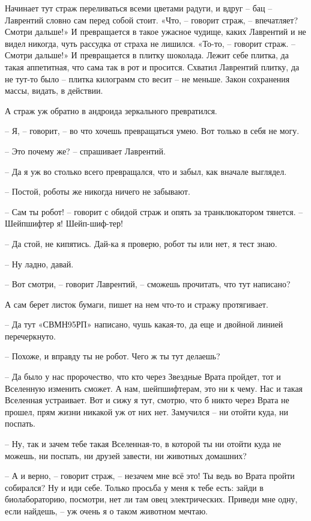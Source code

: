 \documentclass[ebook,oneside,final,openright]{memoir}
\begin{document}
Начинает тут страж переливаться всеми цветами радуги, и вдруг – бац – Лаврентий словно сам перед собой стоит. «Что, – говорит страж, – впечатляет? Смотри дальше!» И превращается в такое ужасное чудище, каких Лаврентий и не видел никогда, чуть рассудка от страха не лишился. «То-то, – говорит страж. – Смотри дальше!» И превращается в плитку шоколада. Лежит себе плитка, да такая аппетитная, что сама так в рот и просится. Схватил Лаврентий плитку, да не тут-то было – плитка килограмм сто весит – не меньше. Закон сохранения массы, видать, в действии. \par
\par
А страж уж обратно в андроида зеркального превратился. \par
– Я, – говорит, – во что хочешь превращаться умею. Вот только в себя не могу. \par
– Это почему же? – спрашивает Лаврентий.\par
– Да я уж во столько всего превращался, что и забыл, как вначале выглядел. \par
– Постой, роботы же никогда ничего не забывают. \par
– Сам ты робот! – говорит с обидой страж и опять за транклюкатором тянется. – Шейпшифтер я! Шейп-шиф-тер! \par
– Да стой, не кипятись. Дай-ка я проверю, робот ты или нет, я тест знаю. \par
– Ну ладно, давай. \par
– Вот смотри, – говорит Лаврентий, – сможешь прочитать, что тут написано? \par
А сам берет листок бумаги, пишет на нем что-то и стражу протягивает. \par
– Да тут «СВМН95РП» написано, чушь какая-то, да еще и двойной линией перечеркнуто.\par
– Похоже, и вправду ты не робот. Чего ж ты тут делаешь? \par
– Да было у нас пророчество, что кто через Звездные Врата пройдет, тот и Вселенную изменить сможет. А нам, шейпшифтерам, это ни к чему. Нас и такая Вселенная устраивает. Вот и сижу я тут, смотрю, что б никто через Врата не прошел, прям жизни никакой уж от них нет. Замучился – ни отойти куда, ни поспать. \par
– Ну, так и зачем тебе такая Вселенная-то, в которой ты ни отойти куда не можешь, ни поспать, ни друзей завести, ни животных домашних? \par
– А и верно, – говорит страж, – незачем мне всё это! Ты ведь во Врата пройти собирался? Ну и иди себе. Только просьба у меня к тебе есть: зайди в биолабораторию, посмотри, нет ли там овец электрических. Приведи мне одну, если найдешь, – уж очень я о таком животном мечтаю.\par
\end{document}
